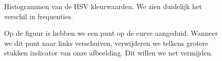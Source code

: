 \documentclass[a4paper,kulak]{kulakarticle}
\begin{document}
\begin{figure}[H]
	\centering
	\qquad
	\qquad
	
	\caption{Histogrammen van de HSV kleurwaarden. We zien duidelijk het verschil in frequenties.}
	\label{figuur HSVHIST}
\end{figure}

\begin{figure}[H]
	\centering
	
	\caption{Op de figuur is hebben we een punt op de curve aangeduid. Wanneer we dit punt naar links verschuiven, verwijderen we telkens grotere stukken indicator van onze afbeelding. Dit willen we net vermijden.}
	\label{figuur HSVHIST_aangeduid}
\end{figure}
\end{document}
